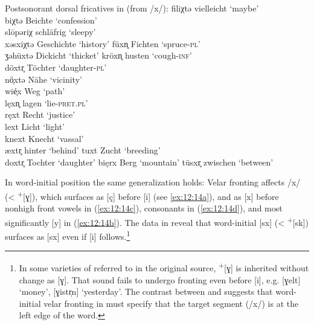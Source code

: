 \ea%
\label{ex:12:13}Postsonorant dorsal fricatives in  (from /x/):
\ea\label{ex:12:13a} filiχtə \tab [filiçtə] \tab vielleicht \tab ‘maybe’ \\
    biχtə \tab [biçtə] \tab Beichte \tab ‘confession’ \\
    slōpəriχ \tab [sloːpəriç] \tab schläfrig \tab ‘sleepy’ \\
    xəsxiχtə \tab [xəsxiçtə] \tab Geschichte \tab ‘history’ 
\ex\label{ex:12:13b} füxn̥ \tab [fyxn̩] \tab Fichten \tab ‘spruce-\textsc{pl}’ \\
    ʒəhüxtə \tab [ɣəhyxtə] \tab Dickicht \tab ‘thicket’ 
\ex\label{ex:12:13c} kröxn̥ \tab [krøxn̩] \tab husten \tab ‘cough-\textsc{inf}’ \\
    döxtr̥ \tab [døxtr̩] \tab Töchter \tab ‘daughter-\textsc{pl}’ \\
    nö̜xtə \tab [nœxtə] \tab  Nähe \tab ‘vicinity’ \\
    wié̜x \tab [viɛx] \tab Weg \tab ‘path’ \\
    lęxn̥ \tab [lɛxn̩] \tab lagen \tab ‘lie-\textsc{pret}.\textsc{pl}’ \\
    ręxt \tab [rɛxt] \tab  Recht \tab ‘justice’ \\
    lext \tab [slext] \tab Licht \tab ‘light’ \\
    knext \tab [knext] \tab Knecht \tab ‘vassal’ \\
    æxtr̥ \tab [æxtr̩] \tab  hinter \tab ‘behind’ 
\ex\label{ex:12:13d} tuxt \tab [tuxt] \tab  Zucht \tab ‘breeding’ \\
    doxtr̥ \tab [doxtr̩] \tab Tochter \tab ‘daughter’ 
\ex\label{ex:12:13e} bięrx \tab [biɛrx] \tab  Berg \tab ‘mountain’ 
\ex\label{ex:12:13f} tüsxr̥ \tab [tysxr̩] \tab zwischen \tab ‘between’ 
\z 
\z 

In word-initial position the same generalization holds: Velar fronting affects /x/ (< \textsuperscript{+}[ɣ]), which surfaces as [ç] before [i] (see \ref{ex:12:14a}), and as [x] before nonhigh front vowels in (\ref{ex:12:14c}), consonants in (\ref{ex:12:14d}), and most significantly [y] in (\ref{ex:12:14b}). The data in  reveal that word-initial [sx] (< \textsuperscript{+}[sk]) surfaces as [sx] even if [i] follows.\footnote{In some varieties of  referred to in the original source,  \textsuperscript{+}[ɣ] is inherited without change as [ɣ]. That sound fails to undergo fronting even before [i], e.g. [ɣelt]  ‘money’, [ɣistr̩n] ‘yesterday’. The contrast between  and  suggests that word-initial velar fronting in  must specify that the target segment (/x/) is at the left edge of the word.}

